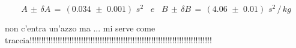 	\begin{equation*}
		A \,\pm\, \delta A \,=\, (0.034 \,\, \pm \,\, 0.001) \,\,s^2 \,\,\,\,\, e \,\,\,\,\,
		B \,\pm\, \delta B \,=\, (4.06 \,\, \pm \,\, 0.01) \,\,s^2 \,/\, kg
	\end{equation*}

non c'entra un'azzo ma ... mi serve come traccia!!!!!!!!!!!!!!!!!!!!!!!!!!!!!!!!!!!!!!!!!!!!!!!!!!!!!!!!!!!!!!!!!!!!!!!!!!!!!!